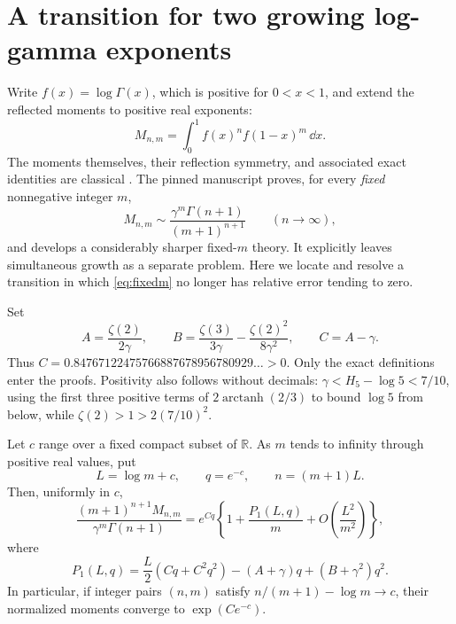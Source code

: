 \section{A transition for two growing log-gamma exponents}
\label{sec:gamma}

Write $f(x)=\log\Gamma(x)$, which is positive for $0<x<1$, and extend
the reflected moments to positive real exponents:
\[
 M_{n,m}=\int_0^1 f(x)^n f(1-x)^m\,\dd x.
\]
The moments themselves, their reflection symmetry, and associated exact
identities are classical \cite{ACEKMM}. The pinned manuscript proves,
for every \emph{fixed} nonnegative integer $m$,
\begin{equation}\label{eq:fixedm}
 M_{n,m}\sim\frac{\gamma^m\Gamma(n+1)}{(m+1)^{n+1}}
 \qquad(n\longrightarrow\infty),
\end{equation}
and develops a considerably sharper fixed-$m$ theory. It explicitly leaves
simultaneous growth as a separate problem. Here we locate and resolve a
transition in which \eqref{eq:fixedm} no longer has relative error tending
to zero.

Set
\begin{equation}\label{eq:gamma-constants}
 A=\frac{\zeta(2)}{2\gamma},\qquad
 B=\frac{\zeta(3)}{3\gamma}-\frac{\zeta(2)^2}{8\gamma^2},\qquad
 C=A-\gamma.
\end{equation}
Thus $C=0.84767122475766887678956780929\ldots>0$.
Only the exact definitions enter the proofs. Positivity also follows
without decimals: $\gamma<H_5-\log5<7/10$, using the first three
positive terms of $2\operatorname{arctanh}(2/3)$ to bound $\log5$
from below, while $\zeta(2)>1>2(7/10)^2$.

\begin{theorem}\label{thm:gamma-transition}
Let $c$ range over a fixed compact subset of $\mathbb R$. As $m$ tends
to infinity through positive real values, put
\[
 L=\log m+c,\qquad q=e^{-c},\qquad n=(m+1)L.
\]
Then, uniformly in $c$,
\begin{equation}\label{eq:gamma-transition}
 \frac{(m+1)^{n+1}M_{n,m}}{\gamma^m\Gamma(n+1)}
 =e^{Cq}\left\{1+\frac{P_1(L,q)}m
       +O\!\left(\frac{L^2}{m^2}\right)\right\},
\end{equation}
where
\begin{equation}\label{eq:gamma-P1}
 P_1(L,q)=\frac L2(Cq+C^2q^2)
             -(A+\gamma)q+(B+\gamma^2)q^2.
\end{equation}
In particular, if integer pairs $(n,m)$ satisfy
$n/(m+1)-\log m\to c$, their normalized moments converge to
$\exp(Ce^{-c})$.
\end{theorem}

